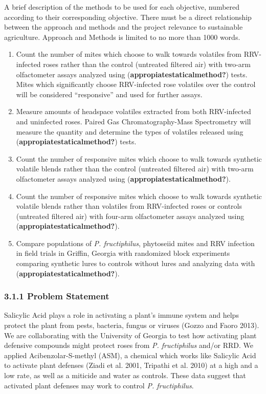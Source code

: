 \documentclass[12pt,final,CPage]{ufthesis}
\begin{document}
{  A brief description of the methods to be used for each objective, numbered according to their corresponding objective. There must be a direct relationship between the approach and methods and the project relevance to sustainable agriculture. Approach and Methods is limited to no more than 1000 words.
  \begin{enumerate}
  \def\labelenumi{\arabic{enumi}.}
  \tightlist
  \item
    Count the number of mites which choose to walk towards volatiles from RRV-infected roses rather than the control (untreated filtered air) with two-arm olfactometer assays analyzed using (\textbf{appropiatestaticalmethod?}) tests. Mites which significantly choose RRV-infected rose volatiles over the control will be considered ``responsive'' and used for further assays.
  \item
    Measure amounts of headspace volatiles extracted from both RRV-infected and uninfected roses. Paired Gas Chromatography-Mass Spectrometry will measure the quantity and determine the types of volatiles released using (\textbf{appropiatestaticalmethod?}) tests.
  \item
    Count the number of responsive mites which choose to walk towards synthetic volatile blends rather than the control (untreated filtered air) with two-arm olfactometer assays analyzed using (\textbf{appropiatestaticalmethod?}).
  \item
    Count the number of responsive mites which choose to walk towards synthetic volatile blends rather than volatiles from RRV-infected roses or controls (untreated filtered air) with four-arm olfactometer assays analyzed using (\textbf{appropiatestaticalmethod?}).
  \item
    Compare populations of \emph{P. fructiphilus}, phytoseiid mites and RRV infection in field trials in Griffin, Georgia with randomized block experiments comparing synthetic lures to controls without lures and analyzing data with (\textbf{appropiatestaticalmethod?}).
  \end{enumerate}
  \hypertarget{problem-statement}{%
  \subsubsection{3.1.1 Problem Statement}\label{problem-statement}}

  Salicylic Acid plays a role in activating a plant's immune system and helps protect the plant from pests, bacteria, fungus or viruses (Gozzo and Faoro 2013). We are collaborating with the University of Georgia to test how activating plant defensive compounds might protect roses from \emph{P. fructiphilus} and/or RRD. We applied Acibenzolar-S-methyl (ASM), a chemical which works like Salicylic Acid to activate plant defenses (Ziadi et al. 2001, Tripathi et al. 2010) at a high and a low rate, as well as a miticide and water as controls. These data suggest that activated plant defenses may work to control \emph{P. fructiphilus}.

}
\end{document}
